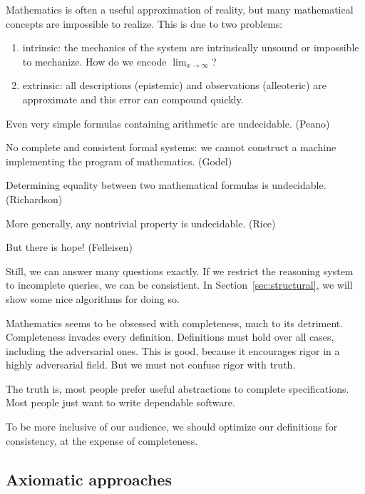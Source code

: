\documentclass[11pt]{article}
\begin{document}
    Mathematics is often a useful approximation of reality, but many mathematical concepts are impossible to realize. This is due to two problems:

    \begin{enumerate}
        \item intrinsic: the mechanics of the system are intrinsically unsound or impossible to mechanize. How do we encode $\lim_{x \rightarrow \infty}$?
        \item extrinsic: all descriptions (epistemic) and observations (alleoteric) are approximate and this error can compound quickly.
    \end{enumerate}

    Even very simple formulas containing arithmetic are undecidable. (Peano)

    No complete and consistent formal systems: we cannot construct a machine implementing the program of mathematics. (Godel)

    Determining equality between two mathematical formulas is undecidable. (Richardson)

    More generally, any nontrivial property is undecidable. (Rice)

    But there is hope! (Felleisen)


    Still, we can answer many questions exactly. If we restrict the reasoning system to incomplete queries, we can be consistient. In Section~\ref{sec:structural}, we will show some nice algorithms for doing so.

    Mathematics seems to be obsessed with completeness, much to its detriment. Completeness invades every definition. Definitions must hold over all cases, including the adversarial ones. This is good, because it encourages rigor in a highly adversarial field. But we must not confuse rigor with truth.

    The truth is, most people prefer useful abstractions to complete specifications. Most people just want to write dependable software.

    To be more inclusive of our audience, we should optimize our definitions for consistency, at the expense of completeness.

    \subsection{Axiomatic approaches}
\end{document}
